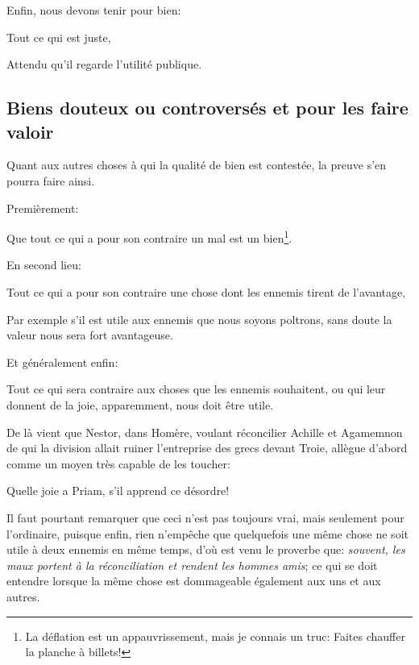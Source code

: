 \bigbreak

Enfin, nous devons tenir pour bien:

\begin{emphpar}
	Tout ce qui est juste,
\end{emphpar}

Attendu qu'il regarde l'utilité publique.

\subsection{Biens douteux ou controversés et pour les faire valoir}

Quant aux autres choses à qui la qualité de bien est contestée, la preuve s'en pourra faire ainsi.

\bigbreak

Premièrement:

\begin{emphpar}
	Que tout ce qui a pour son contraire un mal est un bien\footnote{La déflation est un appauvrissement, mais je
	connais un truc: Faites chauffer la planche à billets!}. 
\end{emphpar}

En second lieu:

\begin{emphpar}
	Tout ce qui a pour son contraire une chose dont les ennemis tirent de l'avantage,
\end{emphpar}

Par exemple s'il est utile aux ennemis que nous soyons poltrons, sans doute la valeur nous sera fort avantageuse.

Et généralement enfin:

\begin{emphpar}
	Tout ce qui sera contraire aux choses que les ennemis souhaitent, ou qui leur donnent de la joie, apparemment,
	nous doit être utile.
\end{emphpar}

De là vient que Nestor, dans Homère, voulant réconcilier Achille et Agamemnon de qui la division allait ruiner
l'entreprise des grecs devant Troie, allègue d'abord comme un moyen très capable de les toucher:

\begin{emphpar}
	Quelle joie a Priam, s'il apprend ce désordre!
\end{emphpar}

Il faut pourtant remarquer que ceci n'est pas toujours vrai, mais seulement pour l'ordinaire, puisque enfin, rien
n'empêche que quelquefois une même chose ne soit utile à deux ennemis en même temps, d'où est venu le proverbe que:
\emph{souvent, les maux portent à la réconciliation et rendent les hommes amis}; ce qui se doit entendre lorsque la
même chose est dommageable également aux uns et aux autres.

